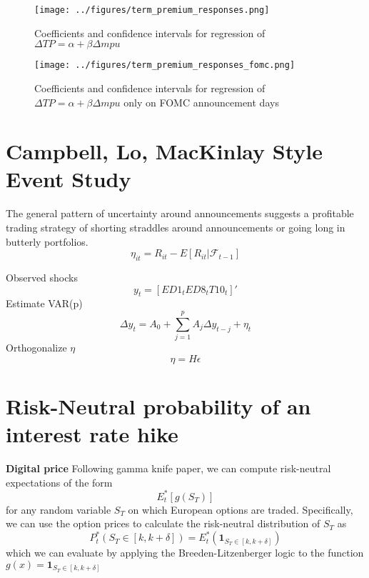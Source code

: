 \documentclass[11pt]{article}
\begin{document}
\begin{figure}
	\centering
	\texttt{[image: ../figures/term\_premium\_responses.png]}
	\caption{Coefficients and confidence intervals for regression of $\Delta TP = \alpha + \beta \Delta mpu$}
	\label{fig:term_premium_responses}
\end{figure}

\begin{figure}
	\centering
	\texttt{[image: ../figures/term\_premium\_responses\_fomc.png]}
	\caption{Coefficients and confidence intervals for regression of $\Delta TP = \alpha + \beta \Delta mpu$ only on FOMC announcement days}
	\label{fig:term_premium_responses_fomc}
\end{figure}
\section{Campbell, Lo, MacKinlay Style Event Study}
The general pattern of uncertainty around announcements suggests a profitable trading strategy of shorting straddles around announcements or going long in butterly portfolios. 
\begin{equation*}
	\eta_{it} = R_{it} - E \left[R_{it}|\mathcal{F}_{t-1}\right]
\end{equation*}

Observed shocks
\begin{equation*}
	y_{t} = \left[ED1_{t} ED8_{t} T10_{t}\right]'
\end{equation*}
Estimate VAR(p) 
\begin{equation*}
	\Delta y_{t} = A_{0} + \sum_{j=1}^{p}A_{j} \Delta y_{t-j}  + \eta_{t}
\end{equation*}
Orthogonalize $\eta$ 
\begin{equation*}
	\eta = H \epsilon
\end{equation*}
\section{Risk-Neutral probability of an interest rate hike}
\textbf{Digital  price} Following gamma knife paper, we can compute risk-neutral expectations of the form
\begin{equation*}
	E_{t}^{*}\left[g(S_{T})\right]
\end{equation*}
for any random variable $S_{T}$ on which European options are traded. Specifically, we can use the option prices to calculate the risk-neutral distribution of $S_{T}$ as 
\begin{equation*}
	P_{t}^{*}\left(S_{T}\in\left[k, k+\delta\right]\right) = E_{t}^{*}\left(\textbf{1}_{S_{T}\in\left[k, k + \delta \right]}\right)
\end{equation*}
which we can evaluate by applying the Breeden-Litzenberger logic to the function $g(x) = \textbf{1}_{S_{T}\in\left[k, k + \delta \right]}$ 
\end{document}
